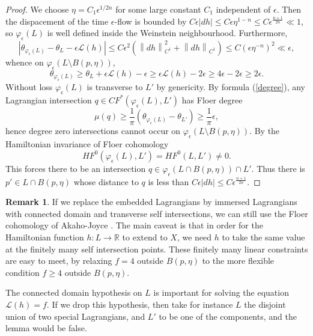 \documentclass[a4paper]{article}
\theoremstyle{definition}
\newtheorem{rmk}{Remark}
\newcommand{\R}{\mathbb{R}}
\newcommand{\norm}[1]{\left\lVert#1\right\rVert}
\begin{document}
\begin{proof}
We choose $\eta=C_1 \epsilon^{1/2n}$ for some large constant $C_1$ independent of $\epsilon$. Then the dispacement of the time $\epsilon$-flow is bounded by $C\epsilon|dh|\leq C\epsilon \eta^{1-n}\leq C \epsilon^{ \frac{n+1}{2n} } \ll 1$, so $\varphi_\epsilon(L)$ is well defined inside the Weinstein neighbourhood. Furthermore, 
\[
|\theta_{\varphi_\epsilon(L)}- \theta_L -  \epsilon\mathcal{L}(h) |\leq C\epsilon^2(\norm{dh}_{C^1}^2+  \norm{dh}_{C^1})\leq  C( \epsilon \eta^{-n}  )^2 \ll \epsilon,
\]
whence on $\varphi_\epsilon( L\setminus B(p, \eta)  )$, 
\[
\theta_{\varphi_\epsilon(L)} \geq \theta_L+ \epsilon\mathcal{L}(h)- \epsilon \geq \epsilon\mathcal{L}(h)- 2\epsilon \geq 4\epsilon- 2\epsilon \geq 2\epsilon. 
\]
Without loss $\varphi_\epsilon(L)$ is transverse to $L'$ by genericity.
By formula (\ref{degree}),
any Lagrangian intersection $q\in CF^*(\varphi_\epsilon(L),L')$ has Floer degree 
\[
\mu(q)\geq \frac{1}{\pi}( \theta_{\varphi_\epsilon(L)}- \theta_{L'} )\geq \frac{1}{\pi}\epsilon,
\]
 hence degree zero intersections cannot occur on $\varphi_\epsilon( L\setminus B(p, \eta)  )$.
By the Hamiltonian invariance of Floer cohomology \[
HF^0(\varphi_\epsilon(L), L')=HF^0(L, L')\neq 0.
\]
This forces there to be an intersection $q\in \varphi_\epsilon( L\cap B(p, \eta)  )\cap L'$. Thus there is $p'\in L\cap B(p,\eta)$ whose distance to $q$ is less than $C\epsilon|dh|\leq C\epsilon^{ \frac{n+1}{2n}  }$.
\end{proof}





\begin{rmk}\label{connecteddomain}
If we replace the embedded Lagrangians by immersed Lagrangians with connected domain and transverse self intersections, we can still use the Floer cohomology of Akaho-Joyce \cite{AkahoJoyce}. The main caveat is that in order for the Hamiltonian function $h: L\to \R$ to extend to $X$, we need $h$ to take the same value at the finitely many self intersection points. These finitely many linear constraints are easy to meet, by relaxing $f=4$ outside $B(p,\eta)$ to the more flexible condition $f\geq 4$  outside $B(p,\eta)$. 


The connected domain hypothesis on $L$ is important for solving the equation $\mathcal{L}(h)=f$. If we drop this hypothesis, then take for instance $L$ the disjoint union of two special Lagrangians, and $L'$ to be one of the components, and the lemma would be false.
\end{rmk}
\end{document}
